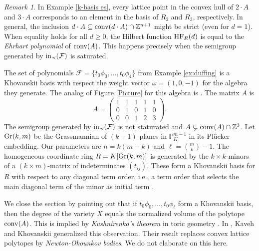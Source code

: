 \documentclass[12pt]{article}
\theoremstyle{definition}
\newenvironment{example}
  {\pushQED{\qed}\renewcommand{\qedsymbol}{$\diamond$}\examplex}
  {\popQED\endexamplex}
\theoremstyle{remark}
\newtheorem{remark}{Remark}
\newcommand{\proj}[1]{\mathbb{P}^{#1}}
\begin{document}
\begin{remark} \label{rem:ehrhart}
In Example \ref{k-basis es}, every lattice point in the convex hull of $2\cdot A$ and $3\cdot A$ corresponds to an element in the basis of $R_2$ and $R_3$, respectively. In general, the inclusion $d \cdot A \subseteq {\rm conv}(d \cdot A) \cap \mathbb{Z}^{n+1}$ might be strict (even for $d =1$). When equality holds for all $d \geq 0$, the Hilbert function ${\rm HF}_R(d)$ is equal to the \emph{Ehrhart polynomial} of $ {\rm conv}(A)$. This happens precisely when the semigroup generated by ${\rm in}_\prec({\cal F})$ is saturated. 
\end{remark}
\begin{example} \label{ex:duffingkhov}
   The set of polynomials $\mathcal{F}= \{t_0\phi_0,\dots, t_0\phi_4\}$ from Example \ref{ex:duffing} is a Khovanskii basis with respect the weight vector $\omega=(1,0,-1)$ for the algebra they generate. The analog of Figure \ref{Picture} for this algebra is \cite[Figure 3]{breiding2022algebraic}. The matrix $A$ is
    \[ A= \begin{pmatrix}
     1 &1 &1  & 1 & 1   \\
        0 &1 &0  & 1 & 0   \\
        0 & 0 & 1 & 2 & 3
    \end{pmatrix}. \]
   The semigroup generated by ${\rm in}_\prec({\cal F})$ is not staturated and $A \subsetneq {\rm conv}(A) \cap \mathbb{Z}^3$. 
\end{example}
\begin{example} \label{ex:grasskhov}
Let ${\rm Gr}(k,m)$ be the Grassmannian of $(k-1)$-planes in $\proj{m-1}_K$ in its Pl\"ucker embedding. Our parameters are $n = k(m-k)$ and $\ell = \binom{m}{k}-1$. The homogeneous coordinate ring $R =K[{\rm Gr}(k,m)]$ is generated by the $k\times k$-minors of a $(k\times m)$-matrix of indeterminates $(t_{ij})$. These form a Khovanskii basis for $R$ with respect to any diagonal term order, i.e., a term order that selects the main diagonal term of the minor as initial term \cite[Theorem 11.8]{sturmfelsgroebner}. 
\end{example}

We close the section by pointing out that if $t_0 \phi_0, \ldots, t_0 \phi_\ell$ form a Khovanskii basis, then the degree of the variety $X$ equals the normalized volume of the polytope ${\rm conv}(A)$. This is implied by \emph{Kushnirenko's theorem} in toric geometry \cite[Theorem 3.16]{telen2022introduction}. In \cite{kaveh2012newton}, Kaveh and Khovanskii generalized this observation. Their result replaces convex lattice polytopes by \emph{Newton-Okounkov bodies}. We do not elaborate on this here.
\end{document}
